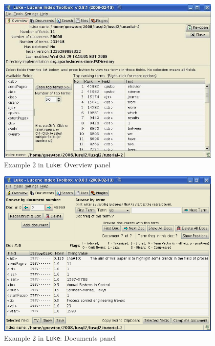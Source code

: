   \begin{figure}
  \begin{center}
 \includegraphics[width=\textwidth]{images/luke_2_1.png}
      \end{center}
  \caption{Example 2 in {\tt Luke}: Overview panel}
\label{luke_2_1}
\end{figure}
  \begin{figure}
  \begin{center}
  \includegraphics[width=\textwidth]{images/luke_2_2.png}
      \end{center}
  \caption{Example 2 in {\tt Luke}: Documents panel}
\label{luke_2_2}
\end{figure}
